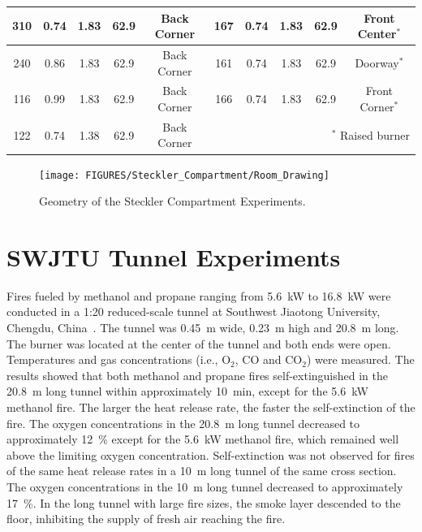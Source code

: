 \begin{table}[h!]
\begin{center}
\begin{tabular}{|c|c|c|c|c||c|c|c|c|c|}
310     & 0.74      & 1.83          &  62.9      & Back Corner  & 167   & 0.74      & 1.83        &  62.9         & Front Center$^*$    \\ \hline
240     & 0.86      & 1.83          &  62.9      & Back Corner  & 161   & 0.74      & 1.83        &  62.9         & Doorway$^*$         \\ \hline
116     & 0.99      & 1.83          &  62.9      & Back Corner  & 166   & 0.74      & 1.83        &  62.9         & Front Corner$^*$    \\ \hline
122     & 0.74      & 1.38          &  62.9      & Back Corner  &  \multicolumn{5}{r|}{$^*$ Raised burner}                   \\ \hline
\end{tabular}
\end{center}
\label{Steckler_Table}
\end{table}


\begin{figure}[!ht]
\texttt{[image: FIGURES/Steckler\_Compartment/Room\_Drawing]}
\caption[Geometry of the Steckler Compartment Experiments]{Geometry of the Steckler Compartment Experiments.}
\label{Steckler_ Drawing}
\end{figure}


\FloatBarrier


\section{SWJTU Tunnel Experiments}
\label{SSJTU_Tunnel_Description}

Fires fueled by methanol and propane ranging from 5.6~kW to 16.8~kW were conducted in a 1:20 reduced-scale tunnel at Southwest Jiaotong University, Chengdu, China~\cite{Wang:TUST2019}. The tunnel was 0.45~m wide, 0.23~m high and 20.8~m long. The burner was located at the center of the tunnel and both ends were open. Temperatures and gas concentrations (i.e., O$_2$, CO and CO$_2$) were measured. The results showed that both methanol and propane fires self-extinguished in the 20.8~m long tunnel within approximately 10~min, except for the 5.6~kW methanol fire. The larger the heat release rate, the faster the self-extinction of the fire. The oxygen concentrations in the 20.8~m long tunnel decreased to approximately 12~\% except for the 5.6~kW methanol fire, which remained well above the limiting oxygen concentration.  Self-extinction was not observed for fires of the same heat release rates in a 10~m long tunnel of the same cross section. The oxygen concentrations in the 10~m long tunnel decreased to approximately 17~\%.  In the long tunnel with large fire sizes, the smoke layer descended to the floor, inhibiting the supply of fresh air reaching the fire.


